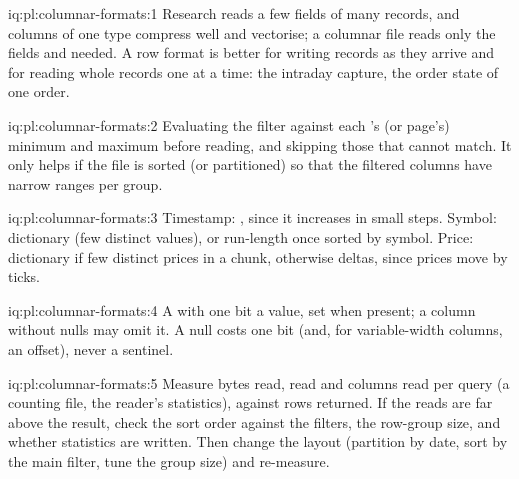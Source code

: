 \begin{solution}{iq:pl:columnar-formats:1}
Research reads a few fields of many records, and columns of one type compress well and vectorise; a columnar file reads only the
fields and  needed. A row format is better for writing records as they arrive and for reading whole records one at a
time: the intraday capture, the order state of one order.
\end{solution}

\begin{solution}{iq:pl:columnar-formats:2}
Evaluating the filter against each 's (or page's) minimum and maximum before reading, and skipping those that cannot
match. It only helps if the file is sorted (or partitioned) so that the filtered columns have narrow ranges per group.
\end{solution}

\begin{solution}{iq:pl:columnar-formats:3}
Timestamp: , since it increases in small steps. Symbol: dictionary (few distinct values), or run-length once sorted
by symbol. Price: dictionary if few distinct prices in a chunk, otherwise deltas, since prices move by ticks.
\end{solution}

\begin{solution}{iq:pl:columnar-formats:4}
A  with one bit a value, set when present; a column without nulls may omit it. A null costs one bit (and, for
variable-width columns, an offset), never a sentinel.
\end{solution}

\begin{solution}{iq:pl:columnar-formats:5}
Measure bytes read,  read and columns read per query (a counting file, the reader's statistics), against rows
returned. If the reads are far above the result, check the sort order against the filters, the row-group size, and whether
statistics are written. Then change the layout (partition by date, sort by the main filter, tune the group size) and re-measure.
\end{solution}

